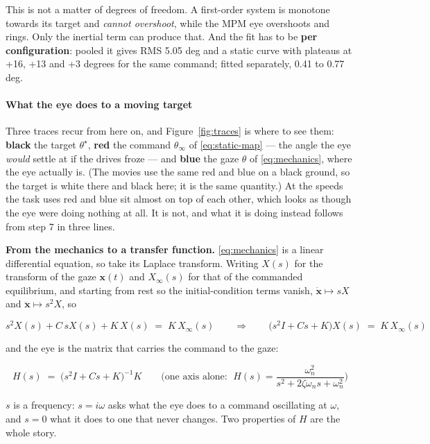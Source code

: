 \documentclass[10pt]{article}
\begin{document}
This is not a matter of degrees of freedom. A first-order system is monotone towards its
target and \emph{cannot overshoot}, while the MPM eye overshoots and rings. Only the
inertial term can produce that. And the fit has to be \textbf{per configuration}: pooled it
gives RMS 5.05 deg and a static curve with plateaus at +16, +13 and +3 degrees for the same
command; fitted separately, 0.41 to 0.77 deg.

\paragraph{What the eye does to a moving target}

Three traces recur from here on, and Figure~\ref{fig:traces} is where to see them:
\textbf{black} the target $\theta^{\star}$, \textbf{red} the command $\theta_\infty$ of
\eqref{eq:static-map} --- the angle the eye \emph{would} settle at if the drives froze ---
and \textbf{blue} the gaze $\theta$ of \eqref{eq:mechanics}, where the eye actually is. (The
movies use the same red and blue on a black ground, so the target is white there and black
here; it is the same quantity.) At the speeds the task uses red and blue sit almost on top
of each other, which looks as though the eye were doing nothing at all. It is not, and what
it is doing instead follows from step 7 in three lines.

\textbf{From the mechanics to a transfer function.} \eqref{eq:mechanics} is a linear
differential equation, so take its Laplace transform. Writing $X(s)$ for the transform of
the gaze $\mathbf{x}(t)$ and $X_\infty(s)$ for that of the commanded equilibrium, and
starting from rest so the initial-condition terms vanish, $\dot{\mathbf{x}}\mapsto sX$ and
$\ddot{\mathbf{x}}\mapsto s^{2}X$, so

\begin{equation}
\label{eq:laplace}
s^{2}X(s) + C\,sX(s) + K\,X(s) \;=\; K\,X_\infty(s)
\qquad\Longrightarrow\qquad
\big(s^{2}I + Cs + K\big)X(s) \;=\; K\,X_\infty(s)
\end{equation}

and the eye is the matrix that carries the command to the gaze:

\begin{equation}
\label{eq:transfer}
H(s)\;=\;\big(s^{2}I + Cs + K\big)^{-1}K
\qquad\text{(one axis alone: }\;
H(s)=\frac{\omega_n^{2}}{s^{2}+2\zeta\omega_n s+\omega_n^{2}}\text{)}
\end{equation}

$s$ is a frequency: $s=i\omega$ asks what the eye does to a command oscillating at $\omega$,
and $s=0$ what it does to one that never changes. Two properties of $H$ are the whole story.
\end{document}
